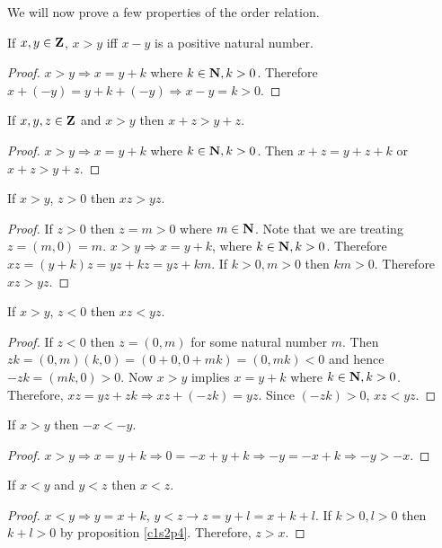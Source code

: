 We will now prove a few properties of the order relation.
\begin{lem}\label{c3s1l16}
If $x, y \in \mathbf{Z}$, $x > y$ iff $x - y$ is a positive natural number.
\end{lem}
\begin{proof}
$x > y \Rightarrow x = y + k$ where $k \in \mathbf{N}, k > 0$. Therefore $x +
(-y) = y + k + (-y) \Rightarrow x - y = k > 0$.
\end{proof}

\begin{lem}\label{c3s1l17}
If $x, y, z \in \mathbf{Z}$ and $x > y$ then $x + z > y + z$.
\end{lem}
\begin{proof}
$x > y \Rightarrow x = y + k$ where $k \in \mathbf{N}, k > 0$. Then $x + z =
y + z + k$ or $x + z > y + z$.
\end{proof}

\begin{lem}\label{c3s1l18}
If $x > y$, $z > 0$ then $xz > yz$.
\end{lem}
\begin{proof}
If $z > 0$ then $z = m > 0$ where $m \in \mathbf{N}$. Note that we are treating
$z = (m, 0) = m$. $x > y \Rightarrow x = y + k$, where $k \in \mathbf{N}, k > 0$.
Therefore $xz = (y + k)z = yz + kz = yz + km$. If $k > 0, m > 0$ then $km
> 0$. Therefore $xz > yz$.
\end{proof}

\begin{lem}\label{c3s1l19}
If $x > y$, $z < 0$ then $xz < yz$.
\end{lem}
\begin{proof}
If $z < 0$ then $z = (0, m)$ for some natural number $m$. Then $zk = (0, m)
(k, 0) = (0 + 0, 0 + mk) = (0, mk) < 0$ and hence $-zk = (mk, 0) > 0$. Now
$x > y$ implies $x = y + k$ where $k \in \mathbf{N}, k > 0$. Therefore, $xz = yz
+ zk \Rightarrow xz + (-zk) = yz$. Since $(-zk) > 0$, $xz < yz$.
\end{proof}

\begin{lem}\label{c3s1l20}
If $x > y$ then $-x < -y$.
\end{lem}
\begin{proof}
$x > y \Rightarrow x = y + k \Rightarrow 0 = -x + y + k \Rightarrow -y = 
-x + k \Rightarrow -y > -x$.
\end{proof}

\begin{lem}\label{c3s1l21}
If $x < y$ and $y < z$ then $x < z$.
\end{lem}
\begin{proof}
$x < y \Rightarrow y = x + k$, $y < z \rightarrow z = y + l = x + k + l$.
If $k > 0, l > 0$ then $k + l > 0$ by proposition \ref{c1s2p4}. Therefore,
$z > x$.
\end{proof}

